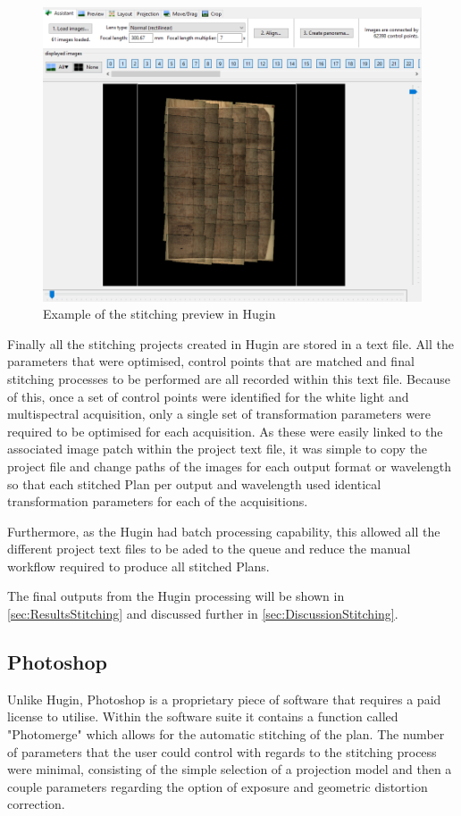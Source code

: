 	\begin{figure}[ht]
		\centering
		\includegraphics[width=1\textwidth]{img/Hugin_Preview.PNG}
		\caption{Example of the stitching preview in Hugin}
		\label{fig:HuginPlanPreview}
	\end{figure}
	
	Finally all the stitching projects created in Hugin are stored in a text file. All the parameters that were optimised, control points that are matched and final stitching processes to be performed are all recorded within this text file. Because of this, once a set of control points were identified for the white light and multispectral acquisition, only a single set of transformation parameters were required to be optimised for each acquisition. As these were easily linked to the associated image patch within the project text file, it was simple to copy the project file and change paths of the images for each output format or wavelength so that each stitched Plan per output and wavelength used identical transformation parameters for each of the acquisitions.
	
	Furthermore, as the Hugin had batch processing capability, this allowed all the different project text files to be aded to the queue and reduce the manual workflow required to produce all stitched Plans.
	
	The final outputs from the Hugin processing will be shown in \cref{sec:ResultsStitching} and discussed further in \cref{sec:DiscussionStitching}.

\subsection{Photoshop}
\label{sec:Photoshop}
Unlike Hugin, Photoshop is a proprietary piece of software that requires a paid license to utilise. Within the software suite it contains a function called "Photomerge" which allows for the automatic stitching of the plan. The number of parameters that the user could control with regards to the stitching process were minimal, consisting of the simple selection of a projection model and then a couple parameters regarding the option of exposure and geometric distortion correction. 


